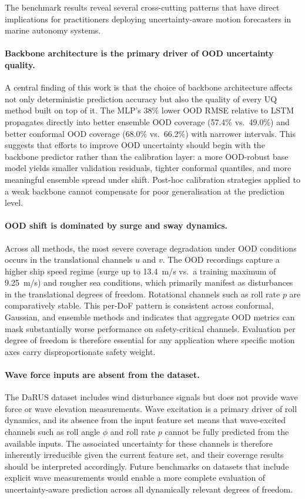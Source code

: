 \documentclass[a4paper,fleqn]{cas-sc}
\begin{document}
The benchmark results reveal several cross-cutting patterns that have direct implications for practitioners deploying uncertainty-aware motion forecasters in marine autonomy systems.

\paragraph{Backbone architecture is the primary driver of OOD uncertainty quality.}
A central finding of this work is that the choice of backbone architecture affects not only deterministic prediction accuracy but also the quality of every UQ method built on top of it. The MLP's 38\% lower OOD RMSE relative to LSTM propagates directly into better ensemble OOD coverage (57.4\% vs.\ 49.0\%) and better conformal OOD coverage (68.0\% vs.\ 66.2\%) with narrower intervals. This suggests that efforts to improve OOD uncertainty should begin with the backbone predictor rather than the calibration layer: a more OOD-robust base model yields smaller validation residuals, tighter conformal quantiles, and more meaningful ensemble spread under shift. Post-hoc calibration strategies applied to a weak backbone cannot compensate for poor generalisation at the prediction level.

\paragraph{OOD shift is dominated by surge and sway dynamics.}
Across all methods, the most severe coverage degradation under OOD conditions occurs in the translational channels $u$ and $v$. The OOD recordings capture a higher ship speed regime (surge up to 13.4~m/s vs.\ a training maximum of 9.25~m/s) and rougher sea conditions, which primarily manifest as disturbances in the translational degrees of freedom. Rotational channels such as roll rate $p$ are comparatively stable. This per-DoF pattern is consistent across conformal, Gaussian, and ensemble methods and indicates that aggregate OOD metrics can mask substantially worse performance on safety-critical channels. Evaluation per degree of freedom is therefore essential for any application where specific motion axes carry disproportionate safety weight.

\paragraph{Wave force inputs are absent from the dataset.}
The DaRUS dataset includes wind disturbance signals but does not provide wave force or wave elevation measurements. Wave excitation is a primary driver of roll dynamics, and its absence from the input feature set means that wave-excited channels such as roll angle $\phi$ and roll rate $p$ cannot be fully predicted from the available inputs. The associated uncertainty for these channels is therefore inherently irreducible given the current feature set, and their coverage results should be interpreted accordingly. Future benchmarks on datasets that include explicit wave measurements would enable a more complete evaluation of uncertainty-aware prediction across all dynamically relevant degrees of freedom.
\end{document}
